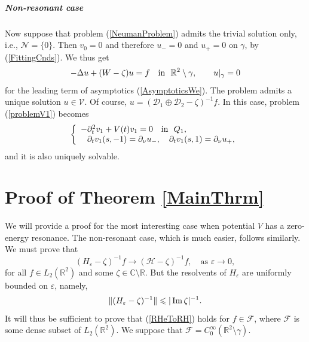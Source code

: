 \documentclass[graybox]{svmult}
\renewcommand{\Im}{\mathop{\rm Im}}
\newcommand{\Real}{\mathbb R}
\newcommand{\Cmpl}{\mathbb C}
\newcommand{\eps}{\varepsilon}
\newcommand{\cF}{\mathcal{F}}
\renewcommand{\leq}{\leqslant}
\newcommand{\eqref}[1]{(\ref{#1})}
\newcommand{\pte}{\partial_t}
\begin{document}
\subparagraph{Non-resonant case}
Now suppose that problem \eqref{NeumanProblem} admits the trivial solution only, i.e.,  $\mathcal{N}=\{0\}$.  Then $v_0=0$ and therefore $u_-=0$ and $u_+=0$ on $\gamma$, by \eqref{FittingCnds}. We thus get
$$
-\Delta u+(W-\zeta)u=f \quad \hbox{in \ } \Real^2\setminus \gamma,\qquad
 u|_{\gamma}=0
$$
for the leading term of asymptotics \eqref{AsymptoticsWe}.
The problem admits a unique solution $u\in \mathcal{V}$. Of course,
$u=(\mathcal{D}_1\oplus\mathcal{D}_2-\zeta)^{-1}f$.
In this case, problem \eqref{problemV1} becomes
\begin{equation}\label{problemV1Non}
\left\{
  \begin{array}{ll}
    -\pte^2 v_1+V(t)v_1=0\quad \hbox{in \ } Q_1, \\
    \phantom{-}\partial_t v_1(s, -1)=\partial_\nu u_-, \quad
\partial_t v_1(s, 1)=\partial_\nu u_+,
  \end{array}
\right.
\end{equation}
and it is also uniquely solvable.









\section{Proof of Theorem \ref{MainThrm}}
\label{Sec:Proof}

We will provide a proof for the most interesting case when potential $V$ has a zero-energy resonance. The non-resonant case, which
is much easier, follows similarly. We must prove that
\begin{equation}\label{RHeToRH}
 (H_\eps-\zeta)^{-1}f\to (\mathcal{H}-\zeta)^{-1}f,\quad \mbox{as } \eps\to 0,
\end{equation}
for all $f\in L_2(\Real^2)$ and some $\zeta\in \Cmpl\setminus\Real$.
But the resolvents of $H_\eps$ are uniformly bounded on $\eps$, namely,
$$
     \|(H_\eps-\zeta)^{-1}\|\leq |\Im \zeta|^{-1}.
$$
It will thus be sufficient to prove that  \eqref{RHeToRH} holds for
$f\in \cF$, where $\cF$ is some dense subset of $L_2(\Real^2)$. We suppose that $\cF=C^\infty_0(\Real^2\setminus\gamma)$.
 
\end{document}
